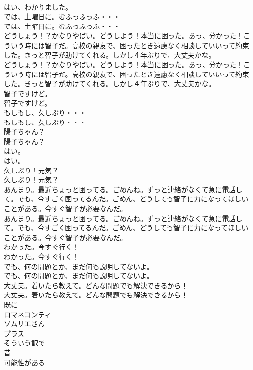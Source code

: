 \documentclass[8pt]{extreport}
\begin{document}
\begin{CJK}{UTF8}{min}
\\	はい、わかりました。 
\\	では、土曜日に。むふっふっふ・・・	
\\	では、土曜日に。むふっふっふ・・・ 
\\	どうしょう！？かなりやばい。どうしよう！本当に困った。あっ、分かった！こういう時には智子だ。高校の親友で、困ったとき遠慮なく相談していいって約束した。きっと智子が助けてくれる。しかし４年ぶりで、大丈夫かな。	
\\	どうしょう！？かなりやばい。どうしよう！本当に困った。あっ、分かった！こういう時には智子だ。高校の親友で、困ったとき遠慮なく相談していいって約束した。きっと智子が助けてくれる。しかし４年ぶりで、大丈夫かな。 
\\	智子ですけど。	
\\	智子ですけど。 
\\	もしもし、久しぶり・・・	
\\	もしもし、久しぶり・・・ 
\\	陽子ちゃん？	
\\	陽子ちゃん？ 
\\	はい。	
\\	はい。 
\\	久しぶり！元気？	
\\	久しぶり！元気？ 
\\	あんまり。最近ちょっと困ってる。ごめんね。ずっと連絡がなくて急に電話して。でも、今すごく困ってるんだ。ごめん、どうしても智子に力になってほしいことがある。今すぐ智子が必要なんだ。	
\\	あんまり。最近ちょっと困ってる。ごめんね。ずっと連絡がなくて急に電話して。でも、今すごく困ってるんだ。ごめん、どうしても智子に力になってほしいことがある。今すぐ智子が必要なんだ。 
\\	わかった。今すぐ行く！	
\\	わかった。今すぐ行く！ 
\\	でも、何の問題とか、まだ何も説明してないよ。	
\\	でも、何の問題とか、まだ何も説明してないよ。 
\\	大丈夫。着いたら教えて。どんな問題でも解決できるから！	
\\	大丈夫。着いたら教えて。どんな問題でも解決できるから！ 
\\	既に
\\	ロマネコンティ
\\	ソムリエさん
\\	プラス
\\	そういう訳で
\\	昔
\\	可能性がある

\end{CJK}
\end{document}
